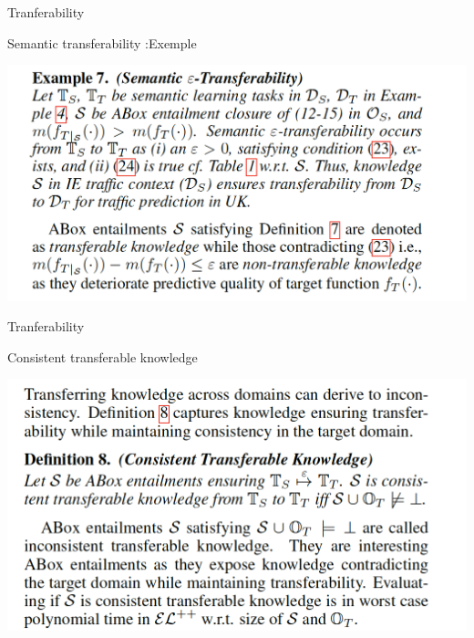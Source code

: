 \documentclass{beamer}
\begin{document}
\begin{frame}{Tranferability}
\begin{block}{Semantic transferability :Exemple}

 \centering
    \includegraphics[scale=0.4]{Figures/epsilon2.png}
\end{block}
\end{frame}

\begin{frame}{Tranferability}
\begin{block}{Consistent transferable knowledge}

 \centering
    \includegraphics[scale=0.4]{Figures/consistent.png}
\end{block}
\end{frame}
\end{document}
